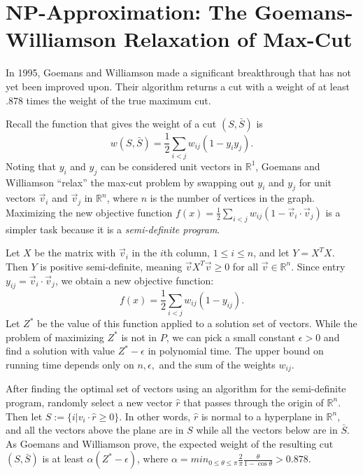 
\section{NP-Approximation: The Goemans-Williamson Relaxation of Max-Cut}

\par In 1995, Goemans and Williamson made a significant breakthrough that has not yet been improved upon. Their algorithm returns a cut with a weight of at least .878 times the weight of the true maximum cut.\cite{GW} \\

\par Recall the function that gives the weight of a cut $(S,\bar{S})$ is $$w(S,\bar{S}) = \frac{1}{2}\sum_{i<j} w_{ij}(1-y_iy_j).$$ Noting that $y_i$ and $y_j$ can be considered unit vectors in $\mathbb{R}^1$, Goemans and Williamson ``relax'' the max-cut problem by swapping out $y_i$ and $y_j$ for unit vectors $\vec{v}_i$ and $\vec{v}_j$ in $\mathbb{R}^n$, where $n$ is the number of vertices in the graph. Maximizing the new objective function $f(x) = \frac{1}{2}\sum_{i<j} w_{ij}(1 - \vec{v}_i \cdot \vec{v}_j)$ is a simpler task because it is a \textit{semi-definite program}.\\

\par Let $X$ be the matrix with $\vec{v}_i$ in the $i$th column, $1 \le i \le n$, and let $Y = X^T X$. Then $Y$ is positive semi-definite, meaning $\vec{v} X^T \vec{v} \ge 0$ for all $\vec{v} \in \mathbb{R}^n$.\cite{GW} Since entry $y_{ij} = \vec{v}_i \cdot \vec{v}_j$, we obtain a new objective function: $$f(x) = \frac{1}{2}\sum_{i<j} w_{ij}(1 - y_{ij}).$$ Let $Z^*$ be the value of this function applied to a solution set of vectors. While the problem of maximizing $Z^*$ is not in $P$, we can pick a small constant $\epsilon > 0$ and find a solution with value $Z^* - \epsilon$ in polynomial time. The upper bound on running time depends only on $n, \epsilon,$ and the sum of the weights $w_{ij}$.\cite{GW} \\

\par After finding the optimal set of vectors using an algorithm for the semi-definite program, randomly select a new vector $\hat{r}$ that passes through the origin of $\mathbb{R}^n$. Then let $S := \{i|v_i\cdot \hat{r} \ge 0\}$. In other words, $\hat{r}$ is normal to a hyperplane in $\mathbb{R}^n$, and all the vectors above the plane are in $S$ while all the vectors below are in $\bar{S}$. As Goemans and Williamson prove, the expected weight of the resulting cut $(S,\bar{S})$ is at least $\alpha(Z^* - \epsilon)$, where $\alpha = min_{0\le \theta \le \pi} \frac{2}{\pi}\frac{\theta}{1-\cos{\theta}} > 0.878$.\cite{GW} \\